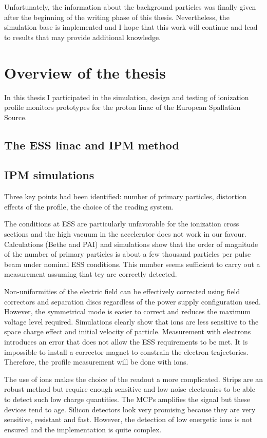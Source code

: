 \begin{refsection}
  Unfortunately, the information about the background particles was finally given after the beginning of the writing phase of this thesis. Nevertheless, the simulation base is implemented and I hope that this work will continue and lead to results that may provide additional knowledge.

  \section{Overview of the thesis}
  In this thesis I participated in the simulation, design and testing of ionization profile monitors prototypes for the proton linac of the European Spallation Source.

  \subsection{The ESS linac and IPM method}

  \subsection{IPM simulations}
  Three key points had been identified: number of primary particles, distortion effects of the profile, the choice of the reading system.

  The conditions at ESS are particularly unfavorable for the ionization cross sections and the high vacuum in the accelerator does not work in our favour. Calculations (Bethe and PAI) and simulations show that the order of magnitude of the number of primary particles is about a few thousand particles per pulse beam under nominal ESS conditions. This number seems sufficient to carry out a measurement assuming that tey are correctly detected.

  Non-uniformities of the electric field can be effectively corrected using field correctors and separation discs regardless of the power supply configuration used. However, the symmetrical mode is easier to correct and reduces the maximum voltage level required.
  Simulations clearly show that ions are less sensitive to the space charge effect and initial velocity of particle. Measurement with electrons introduces an error that does not allow the ESS requirements to be met. It is impossible to install a corrector magnet to constrain the electron trajectories. Therefore, the profile measurement will be done with ions.

  The use of ions makes the choice of the readout a more complicated. Strips are an robust method but require enough sensitive and low-noise electronics to be able to detect such low charge quantities.
  The MCPs amplifies the signal but these devices tend to age. Silicon detectors look very promising because they are very sensitive, resistant and fast. However, the detection of low energetic ions is not ensured and the implementation is quite complex.


\end{refsection}
